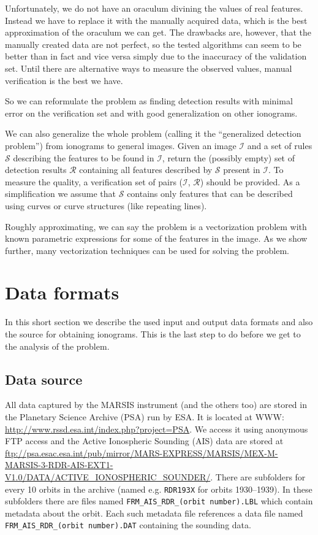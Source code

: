 Unfortunately, we do not have an oraculum divining the values of real features. Instead we have to replace it with the manually acquired data, which is the best approximation of the oraculum we can get. The drawbacks are, however, that the manually created data are not perfect, so the tested algorithms can seem to be better than in fact and vice versa simply due to the inaccuracy of the validation set. Until there are alternative ways to measure the observed values, manual verification is the best we have.

So we can reformulate the problem as finding detection results with minimal error on the verification set and with good generalization on other ionograms.

We can also generalize the whole problem (calling it the ``generalized detection problem'') from ionograms to general images. Given an image $\mathcal{I}$ and a set of rules $\mathcal{S}$ describing the features to be found in $\mathcal{I}$, return the (possibly empty) set of detection results $\mathcal{R}$ containing all features described by $\mathcal{S}$ present in $\mathcal{I}$. To measure the quality, a verification set of pairs ($\mathcal{I}$, $\mathcal{R}$) should be provided. As a simplification we assume that $\mathcal{S}$ contains only features that can be described using curves or curve structures (like repeating lines).

Roughly approximating, we can say the problem is a vectorization problem with known parametric expressions for some of the features in the image. As we show further, many vectorization techniques can be used for solving the problem.

\section{Data formats}
In this short section we describe the used input and output data formats and also the source for obtaining ionograms. This is the last step to do before we get to the analysis of the problem. 

\subsection{Data source}
All data captured by the MARSIS instrument (and the others too) are stored in the Planetary Science Archive (PSA) run by ESA. It is located at WWW: \url{http://www.rssd.esa.int/index.php?project=PSA}. We access it using anonymous FTP access and the Active Ionospheric Sounding (AIS) data are stored at \url{ftp://psa.esac.esa.int/pub/mirror/MARS-EXPRESS/MARSIS/MEX-M-MARSIS-3-RDR-AIS-EXT1-V1.0/DATA/ACTIVE\_IONOSPHERIC\_SOUNDER/}. There are subfolders for every 10 orbits in the archive (named e.g. \texttt{RDR193X} for orbits 1930--1939). In these subfolders there are files named \texttt{FRM\_AIS\_RDR\_(orbit number).LBL} which contain metadata about the orbit. Each such metadata file references a data file named \texttt{FRM\_AIS\_RDR\_(orbit number).DAT} containing the sounding data.

